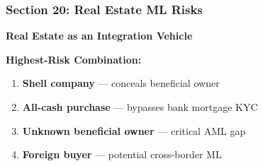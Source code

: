 \documentclass[12pt,aspectratio=169]{beamer}
\begin{document}
	\begin{frame}
		\frametitle{\fontsize{13}{15}\selectfont \textbf{Section 20: Real Estate ML Risks}}
		\vspace{0.3cm}
		\begin{center}
			{\fontsize{12}{14}\selectfont \textbf{Real Estate as an Integration Vehicle}}
		\end{center}
		\vspace{0.2cm}
		\begin{block}{}
			\centering
			\textbf{Highest-Risk Combination:}
			\vspace{0.1cm}
			\begin{enumerate}
				\item \textbf{Shell company} — conceals beneficial owner
				\item \textbf{All-cash purchase} — bypasses bank mortgage KYC
				\item \textbf{Unknown beneficial owner} — critical AML gap
				\item \textbf{Foreign buyer} — potential cross-border ML
			\end{enumerate}
		\end{block}
	\end{frame}
	
\end{document}
